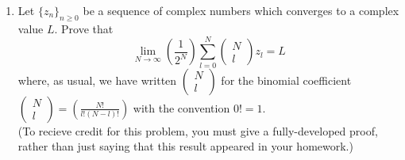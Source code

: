 \documentclass[11pt]{article}
\begin{document}
\begin{enumerate}
  \item Let \(\{z_n\}_{n \geq 0}\) be a sequence of complex numbers which converges to a complex value \(L\).  Prove that
    \[\lim_{N \to \infty} \left(\frac{1}{2^N}\right) \sum_{l=0}^{N} \begin{pmatrix} N \\ l \end{pmatrix} z_l = L\]
    where, as usual, we have written \(\begin{pmatrix} N \\ l \end{pmatrix}\) for the binomial coefficient 
    \(\begin{pmatrix} N \\ l \end{pmatrix} = \left( \displaystyle\frac{N!}{l!(N-l)!} \right)\) with the convention 
      \(0! = 1\). \\

      (To recieve credit for this problem, you must give a fully-developed proof, rather than just saying that this
      result appeared in your homework.)
\end{enumerate}
\end{document}
